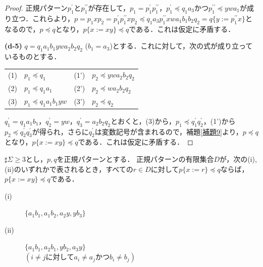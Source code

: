 \begin{proof}
正規パターン$p_{1}^{\prime}$と$p_{1}^{\prime\prime}$が存在して，$p_{1}=p_{1}^{\prime}p_{1}^{\prime\prime}$，$p_{1}^{\prime} \preceq q_{1}a_{3}$かつ$p_{1}^{\prime\prime} \preceq ywa_{1}$が成り立つ．これらより，$p=p_{1}xp_{2}=p_{1}^{\prime}p_{1}^{\prime\prime}xp_{2}\preceq q_{1}a_{3}p_{1}^{\prime\prime}xwa_{1}b_{1}b_{2}q_{2}=q \{ y := p_{1}^{\prime\prime}x \}$となるので，$p \preceq q$となり，$p \{ x := xy \} \preceq q$である．これは仮定に矛盾する．
\smallskip

\textbf{(d-5)} $q=q_{1}a_{1}b_{1}ywa_{2}b_{2}q_{2}$ ($b_{1}=a_{3}$)とする．これに対して，次の式が成り立っているものとする．
\smallskip

\begin{tabular}{llll}
(1) & $p_{1} \preceq q_{1}$ & (1') & $p_{2} \preceq ywa_{2}b_{2}q_{2}$ \\
(2) & $p_{1} \preceq q_{1}a_{1}$ & (2') & $p_{2} \preceq wa_{2}b_{2}q_{2}$ \\
(3) & $p_{1} \preceq q_{1}a_{1}b_{1}yw$ & (3') & $p_{2} \preceq q_{2}$
\end{tabular}
\smallskip

$q_{1}^{\prime}=q_{1}a_{1}b_{1}$，$q_{2}^{\prime}=yw$，$q_{3}^{\prime}=a_{2}b_{2}q_{2}$とおくと，(3)から，$p_{1} \preceq q_{1}^{\prime}q_{2}^{\prime}$，(1')から$p_{2} \preceq q_{2}^{\prime}q_{3}^{\prime}$が得られ，さらに$q_{2}^{\prime}$は変数記号が含まれるので，補題\ref{補題9}より，$p \preceq q$となり，$p \{ x := xy \} \preceq q$である．これは仮定に矛盾する．
\end{proof}

\begin{lem}\label{追加補題2}
$\sharp \Sigma \ge 3$とし，$p, q$を正規パターンとする．
正規パターンの有限集合$D$が，次の{\rm (i), (ii)}のいずれかで表されるとき，すべての$r \in D$に対して$p \{ x := r \} \preceq q$ならば，$p \{ x := xy \} \preceq q$である．
\begin{description}
\item[{\rm (i)}] $\{ a_{1}b_{1}, a_{1}b_{2}, a_{2}y, yb_{3} \} $
\item[{\rm (ii)}] $\{ a_{1}b_{1}, a_{2}b_{1}, yb_{2}, a_{3}y \}$ \\ 
$(i \ne j \mathrm{に対して}a_{i} \ne a_{j}\mathrm{かつ}b_{i} \ne b_{j})$
\end{description}
\end{lem}

